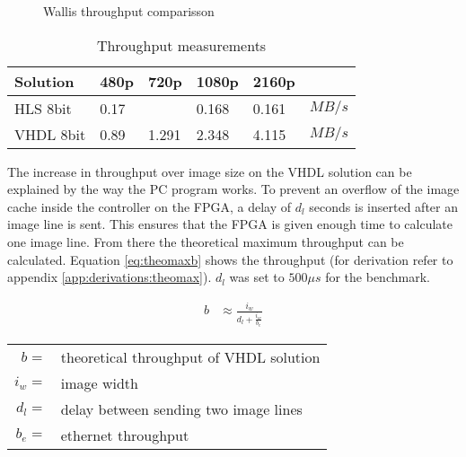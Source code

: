 \begin{figure}[tb!]
    \centering
    \begin{adjustbox}{max width=\linewidth}
        
    \end{adjustbox}
    \caption{Wallis throughput comparisson}
    \label{fig:benchmarkcompare}
\end{figure}

\begin{table}[tb!]
    \centering
    \begin{tabular}{l l l l l l}
        \toprule
        Solution & 480p & 720p & 1080p & 2160p & \\
        \midrule
        HLS 8bit   & 0.17  &       & 0.168 & 0.161 & $MB/s$ \\
        VHDL 8bit      & 0.89  & 1.291 & 2.348 & 4.115 & $MB/s$\\
        \bottomrule
    \end{tabular}
    \caption{Throughput measurements}
    \label{tab:throughputmeasuremetns}
\end{table}

The increase in throughput over image size on the VHDL solution can be explained
by the way the
PC program works. To prevent an overflow of the image cache inside the
controller on the FPGA, a delay of $d_l$ seconds is inserted after an image line
is sent. This ensures that the FPGA is given enough time to calculate one image
line. From there the theoretical maximum throughput can be calculated. Equation
\ref{eq:theomaxb} shows the throughput (for derivation refer to appendix 
\ref{app:derivations:theomax}). $d_l$ was set to $500\mu s$ for the benchmark.

\begin{align}
    b  & \approx \frac{i_w}{d_l + \frac{i_w}{b_e}}
    \label{eq:theomaxb}
\end{align}

\begin{tabular}{rl}
    $b     =$ & theoretical throughput of VHDL solution \\
    $i_w   =$ & image width \\
    $d_l   =$ & delay between sending two image lines \\
    $b_e   =$ & ethernet throughput \\
\end{tabular} \\

